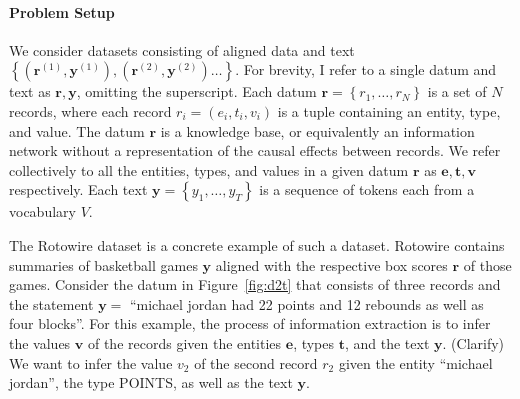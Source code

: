 \documentclass[12pt]{article}
\newcommand\set[1]{\left\{#1\right\}}
\newcommand{\be}{\mathbf{e}}
\newcommand{\br}{\mathbf{r}}
\newcommand{\bt}{\mathbf{t}}
\newcommand{\bv}{\mathbf{v}}
\newcommand{\by}{\mathbf{y}}
\begin{document}
\paragraph{Problem Setup}
We consider datasets consisting of aligned data and text
$\set{(\br^{(1)}, \by^{(1)}),(\br^{(2)},\by^{(2)})\ldots}$.
For brevity, I refer to a single datum and text as $\br,\by$, omitting the superscript.
Each datum $\br = \set{r_1,\ldots,r_N}$ is a set of $N$ records, where each record $r_i = (e_i, t_i, v_i)$
is a tuple containing an entity, type, and value.
The datum $\br$ is a knowledge base, or equivalently an information network
without a representation of the causal effects between records.
We refer collectively to all the entities, types, and values in a given datum $\br$ as
$\be,\bt,\bv$ respectively.
Each text $\by = \set{y_1,\ldots,y_T}$ is a sequence of tokens each from a vocabulary $V$.

The Rotowire dataset \citep{wiseman2017d2t} is a concrete example of such a dataset.
Rotowire contains summaries of basketball games $\by$ aligned with the respective
box scores $\br$ of those games.
Consider the datum in Figure~\ref{fig:d2t} that consists of three records
and the statement $\by = $ ``michael jordan had 22 points and 12 rebounds as well as four blocks''.
For this example, the process of information extraction is to infer 
the values $\bv$ of the records given the entities $\be$, types $\bt$, and the text $\by$.
(Clarify)
We want to infer the value $v_2$ of the second record $r_2$ given 
the entity ``michael jordan'', the type POINTS, as well as the text $\by$.
\end{document}
